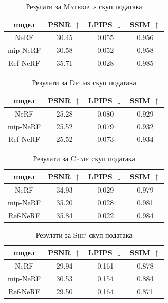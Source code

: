 \documentclass[12pt, a4paper, twoside]{book}
\numberwithin{equation}{chapter}
\numberwithin{theorem}{section}
\numberwithin{definition}{section}
\numberwithin{definitionChapter}{chapter}
\begin{document}
	\begin{table}[H]
		\centering
		\begin{tabular}{cccc} \toprule
			{mодел}			& {PSNR $\uparrow$} & {LPIPS $\downarrow$}	& {SSIM $\uparrow$} \\ \midrule
			{NeRF} 			& 30.45 			& 0.055					& 0.956 \\ 
			{mip-NeRF}		& 30.58 			& 0.052					& 0.958 \\
			{Ref-NeRF}		& 35.71				& 0.028					& 0.985 \\ \bottomrule
		\end{tabular}
		\caption{Резулати за \textsc{Materials} скуп података}
		\label{table-materials}
	\end{table}

	\begin{table}[H]
		\centering
		\begin{tabular}{cccc} \toprule
			{mодел}			& {PSNR $\uparrow$} & {LPIPS $\downarrow$}	& {SSIM $\uparrow$} \\ \midrule
			{NeRF}			& 25.28				& 0.080 				& 0.929 \\ 
			{mip-NeRF}		& 25.52				& 0.079					& 0.932 \\
			{Ref-NeRF}		& 25.52				& 0.073					& 0.934 \\ \bottomrule
		\end{tabular}
		\caption{Резулати за \textsc{Drums} скуп података}
		\label{table-drums}
	\end{table}

	\begin{table}[H]
		\centering
		\begin{tabular}{cccc} \toprule
			{mодел} 		& {PSNR $\uparrow$} & {LPIPS $\downarrow$}	& {SSIM $\uparrow$} \\ \midrule
			{NeRF} 			& 34.93				& 0.029					& 0.979 \\ 
			{mip-NeRF} 		& 35.20				& 0.028					& 0.981 \\
			{Ref-NeRF}		& 35.84				& 0.022					& 0.984 \\ \bottomrule
		\end{tabular}
		\caption{Резулати за \textsc{Chair} скуп података}
		\label{table-chair}
	\end{table}

	\begin{table}[H]
		\centering
		\begin{tabular}{cccc} \toprule
			{mодел}			& {PSNR $\uparrow$} & {LPIPS $\downarrow$}	& {SSIM $\uparrow$} \\ \midrule
			{NeRF}			& 29.94				& 0.161					& 0.878 \\ 
			{mip-NeRF}		& 30.53 			& 0.154					& 0.884 \\
			{Ref-NeRF}		& 29.50				& 0.164					& 0.871 \\ \bottomrule
		\end{tabular}
		\caption{Резулати за \textsc{Ship} скуп података}
		\label{table-ship}
	\end{table}
\end{document}
